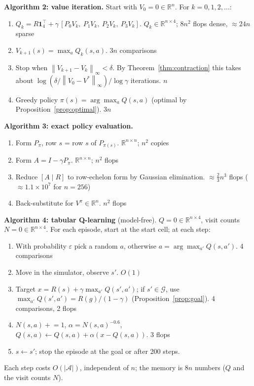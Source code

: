 \documentclass[10pt]{article}
\theoremstyle{definition}
\newcommand{\R}{\mathbb{R}}
\newcommand{\one}{\mathbf{1}}
\newcommand{\norm}[1]{\left\lVert #1\right\rVert_\infty}
\newcommand{\Aset}{\mathcal{A}}
\newcommand{\Gset}{\mathcal{G}}
\begin{document}
\medskip
\noindent\textbf{Algorithm 2: value iteration.} Start with $V_0 = 0\in\R^n$. For $k = 0,1,2,\dots$:
\begin{enumerate}[nosep]
\item $Q_k = R\one_4^\top + \gamma\,[P_0V_k,\ P_1V_k,\ P_2V_k,\ P_3V_k]$. \hfill $Q_k\in\R^{n\times4}$; $8n^2$ flops dense, $\approx24n$ sparse
\item $V_{k+1}(s) = \max_aQ_k(s,a)$. \hfill $3n$ comparisons
\item Stop when $\norm{V_{k+1}-V_k}<\delta$. By Theorem~\ref{thm:contraction} this takes about $\log(\delta/\norm{V_0-V^*})/\log\gamma$ iterations. \hfill $n$
\item Greedy policy $\pi(s) = \arg\max_aQ(s,a)$ (optimal by Proposition~\ref{prop:optimal}). \hfill $3n$
\end{enumerate}

\medskip
\noindent\textbf{Algorithm 3: exact policy evaluation.}
\begin{enumerate}[nosep]
\item Form $P_\pi$, row $s$ = row $s$ of $P_{\pi(s)}$. \hfill $\R^{n\times n}$; $n^2$ copies
\item Form $A = I-\gamma P_\pi$. \hfill $\R^{n\times n}$; $n^2$ flops
\item Reduce $[A\mid R]$ to row-echelon form by Gaussian elimination. \hfill $\approx\frac23n^3$ flops ($\approx1.1\times10^7$ for $n = 256$)
\item Back-substitute for $V^\pi\in\R^n$. \hfill $n^2$ flops
\end{enumerate}

\medskip
\noindent\textbf{Algorithm 4: tabular Q-learning} (model-free). $Q = 0\in\R^{n\times4}$, visit counts $N = 0\in\R^{n\times4}$. For each episode, start at the start cell; at each step:
\begin{enumerate}[nosep]
\item With probability $\varepsilon$ pick a random $a$, otherwise $a = \arg\max_{a'}Q(s,a')$. \hfill 4 comparisons
\item Move in the simulator, observe $s'$. \hfill $O(1)$
\item Target $x = R(s) + \gamma\max_{a'}Q(s',a')$; if $s'\in\Gset$, use $\max_{a'}Q(s',a') = R(g)/(1-\gamma)$ (Proposition~\ref{prop:goal}). \hfill 4 comparisons, 2 flops
\item $N(s,a)\mathrel{+}=1$, $\alpha = N(s,a)^{-0.6}$, $Q(s,a)\leftarrow Q(s,a) + \alpha(x - Q(s,a))$. \hfill 3 flops
\item $s\leftarrow s'$; stop the episode at the goal or after 200 steps.
\end{enumerate}
Each step costs $O(|\Aset|)$, independent of $n$; the memory is $8n$ numbers ($Q$ and the visit counts $N$).
\end{document}
